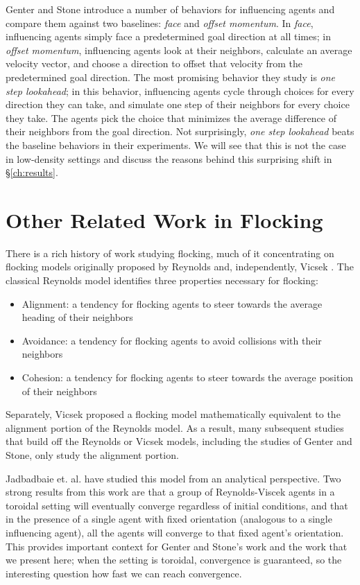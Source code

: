 Genter and Stone introduce a number of behaviors for influencing agents and
compare them against two baselines: \textit{face} and \textit{offset momentum}.
In \textit{face}, influencing agents simply face a predetermined goal direction
at all times; in \textit{offset momentum}, influencing agents look at their
neighbors, calculate an average velocity vector, and choose a direction to
offset that velocity from the predetermined goal direction.
The most promising behavior they study is \textit{one step lookahead}; in this
behavior, influencing agents cycle through choices for every direction they
can take, and simulate one step of their neighbors for every choice they take.
The agents pick the choice that minimizes the average difference of their
neighbors from the goal direction.
Not surprisingly, \textit{one step lookahead} beats the baseline behaviors in
their experiments.
We will see that this is not the case in low-density settings and discuss the
reasons behind this surprising shift in \S\ref{ch:results}.

\section{Other Related Work in Flocking}
There is a rich history of work studying flocking, much of it concentrating on
flocking models originally proposed by Reynolds \cite{reynoldsmodel} and,
independently, Vicsek \cite{vicsek1995}.
The classical Reynolds model identifies three properties necessary for
flocking:
\begin{itemize}
    \item Alignment: a tendency for flocking agents to steer towards the
            average heading of their neighbors
    \item Avoidance: a tendency for flocking agents to avoid collisions with
            their neighbors
    \item Cohesion: a tendency for flocking agents to steer towards the average
            position of their neighbors
\end{itemize}
\noindent Separately, Vicsek proposed a flocking model mathematically
equivalent to the alignment portion of the Reynolds model.
As a result, many subsequent studies that build off the Reynolds or Vicsek
models, including the studies of Genter and Stone, only study the alignment
portion.

Jadbadbaie et. al. \cite{jad2003convergence} have studied this model from an
analytical perspective.
Two strong results from this work are that a group of Reynolds-Viscek agents
in a toroidal setting will eventually converge regardless of initial
conditions, and that in the presence of a single agent with fixed orientation
(analogous to a single influencing agent), all the agents will converge to that
fixed agent's orientation.
This provides important context for Genter and Stone's work and the work that
we present here; when the setting is toroidal, convergence is guaranteed, so
the interesting question how fast we can reach convergence.


